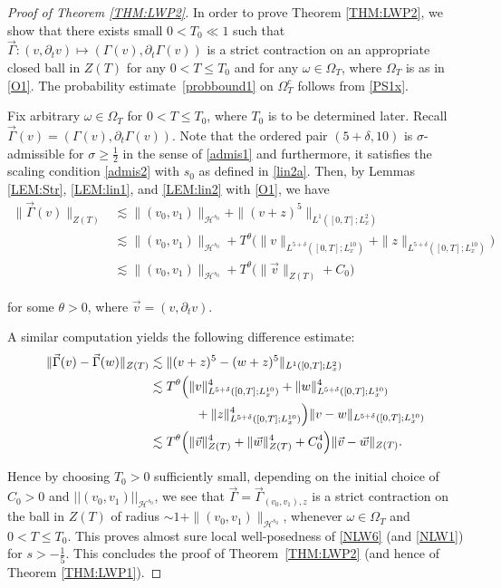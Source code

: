 \documentclass[letterpaper, 11pt,  reqno]{amsart}
\newcommand{\1}{\hspace{0.5mm}\text{I}\hspace{0.2mm}}
\newcommand{\noi}{\noindent}
\newcommand{\dl}{\delta}
\newcommand{\G}{\Gamma}
\newcommand{\dt}{\partial_t}
\newcommand{\ta}{\theta}
\renewcommand{\o}{\omega}
\renewcommand{\O}{\Omega}
\newcommand{\les}{\lesssim}
\renewcommand{\H}{\mathcal{H}}
\numberwithin{equation}{section}
\numberwithin{theorem}{section}
\begin{document}
\begin{proof}[Proof of Theorem \ref{THM:LWP2}]
\noi
In order to prove 
Theorem \ref{THM:LWP2}, 
we  show that 
there exists small $ 0 < T_{0} \ll 1$ such that  $\vec \G: (v, \partial_{t}v) \mapsto (\G(v), \dt \G(v))$ 
is a strict contraction  on an appropriate closed ball in $Z(T)$ for any $0 < T \le T_{0}$
and for any $\o \in \O_T$, where $\O_T$
is as in \eqref{O1}.
The probability estimate~\eqref{probbound1} on $\O_T^c$ follows
from \eqref{PS1x}.




Fix  arbitrary $\omega \in \O_T$ for $0 < T \le T_{0}$, where $T_0$ is to be determined later.
 Recall $\vec \G(v) = (\G(v), \dt \G(v))$.
Note that the ordered pair $(5 + \delta, 10)$ is $\sigma$-admissible for $\sigma \ge \frac{1}{2}$ in the sense of \eqref{admis1} and furthermore, it satisfies the scaling condition \eqref{admis2} with $s_{0}$ as defined in \eqref{lin2a}. Then, by Lemmas \ref{LEM:Str}, \ref{LEM:lin1}, and \ref{LEM:lin2}
with \eqref{O1}, 
we have 
\begin{align*}
\|\vec \G(v)\|_{Z(T)}
& \les \| (v_0, v_1) \|_{\H^{s_0}}
+ \|(v+z)^5\|_{L^1([0, T]; L^2_x)}\\
& \les \| (v_0, v_1) \|_{\H^{s_0}}
+ T^\ta \Big(\|v\|_{L^{5+\dl}([0, T]; L^{10}_x)}
+ \|z\|_{L^{5+\dl}([0, T]; L^{10}_x)}\Big)\\
& \les \| (v_0, v_1) \|_{\H^{s_0}}
+ T^\ta \Big(\|\vec v\|_{Z(T)}
+ C_0 \Big)
\end{align*}

\noi
for some $\ta > 0$, where $\vec v = (v, \dt v)$.

A similar computation yields the following difference estimate:
\begin{align*}
\|\vec \G(v) - \vec \G(w)\|_{Z(T)}
& \les 
\|(v+z)^5 - (w+z)^5\|_{L^1([0, T]; L^2_x)}\\
& \les T^\ta \Big( \| v\|_{L^{5+\dl}([0, T]; L^{10}_x)}^4 
+ \| w\|_{L^{5+\dl}([0, T]; L^{10}_x)}^4\\
& \hphantom{XXXX}+ \|z\|_{L^{5+\dl}([0, T]; L^{10}_x)}^4\Big)
 \| v -  w\|_{L^{5+\dl}([0, T]; L^{10}_x)}\\
 & \les T^\ta \Big( \|\vec v\|_{Z(T)}^4 
+ \|\vec w\|_{Z(T)}^4
+ C_0^4\Big)
 \|\vec v - \vec w\|_{Z(T)}.
\end{align*}


\noi
Hence 
by choosing $T_{0} > 0$ sufficiently small, depending on the initial choice of $C_0 > 0$ and $||(v_{0}, v_{1})||_{\mathcal{H}^{s_{0}}}$, we see that $\vec \G
=  \vec \G_{(v_0, v_1), z} $
is a strict contraction on the ball in $Z(T)$ of radius $\sim 
1 + \| (v_0, v_1) \|_{\H^{s_0}}$, 
 whenever $\omega \in \O_T$ and $0 < T \le T_{0}$. 
This proves almost sure local well-posedness of \eqref{NLW6} 
(and \eqref{NLW1}) for $s > -\frac 15$.
This concludes the proof of Theorem~\ref{THM:LWP2}
(and hence of Theorem \ref{THM:LWP1}).
\end{proof}
\end{document}
